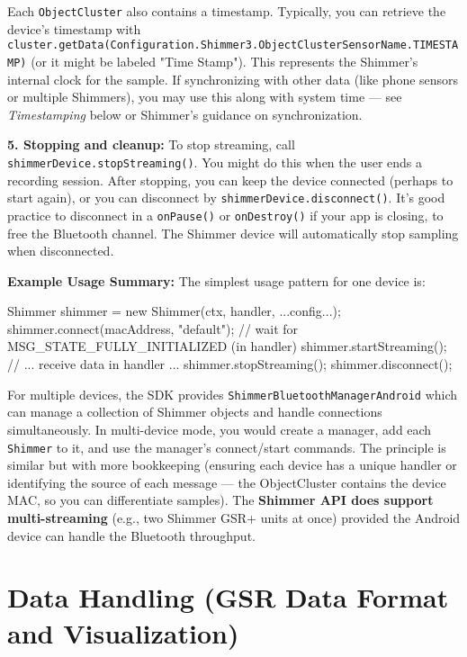 {{Each \texttt{ObjectCluster} also contains a timestamp. Typically, you can
retrieve the device's timestamp with
\texttt{cluster.getData(Configuration.Shimmer3.ObjectClusterSensorName.TIMESTAMP)}
(or it might be labeled "Time Stamp"). This represents the Shimmer's
internal clock for the
sample\cite{ContactlessStressThermal2022}\cite{ContactlessStressThermal2022}.
If synchronizing with other data (like phone sensors or multiple
Shimmers), you may use this along with system time --- see \textit{Timestamping}
below or Shimmer's guidance on synchronization.

\textbf{5. Stopping and cleanup:} To stop streaming, call
\texttt{shimmerDevice.stopStreaming()}. You might do this when the user ends a
recording session. After stopping, you can keep the device connected
(perhaps to start again), or you can disconnect by
\texttt{shimmerDevice.disconnect()}. It's good practice to disconnect in a
\texttt{onPause()} or \texttt{onDestroy()} if your app is closing, to free the
Bluetooth channel. The Shimmer device will automatically stop sampling
when disconnected.

\textbf{Example Usage Summary:} The simplest usage pattern for one device is:

    Shimmer shimmer = new Shimmer(ctx, handler, ...config...);
    shimmer.connect(macAddress, "default");
    // wait for MSG_STATE_FULLY_INITIALIZED (in handler)
    shimmer.startStreaming();
    // ... receive data in handler ...
    shimmer.stopStreaming();
    shimmer.disconnect();

For multiple devices, the SDK provides \texttt{ShimmerBluetoothManagerAndroid}
which can manage a collection of Shimmer objects and handle connections
simultaneously. In multi-device mode, you would create a manager, add
each \texttt{Shimmer} to it, and use the manager's connect/start commands. The
principle is similar but with more bookkeeping (ensuring each device has
a unique handler or identifying the source of each message --- the
ObjectCluster contains the device MAC, so you can differentiate
samples\cite{DriverStressThermal2020}).
The \textbf{Shimmer API does support multi-streaming} (e.g., two Shimmer GSR+
units at once) provided the Android device can handle the Bluetooth
throughput\cite{DriverStressThermal2020}\cite{ContactlessStressThermal2022}.

\section{Data Handling (GSR Data Format and Visualization)}

}}
